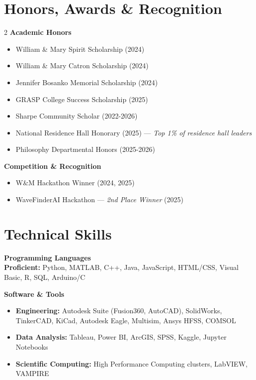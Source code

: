 \documentclass[11pt,letterpaper]{article}
\begin{document}
\section{Honors, Awards \& Recognition}

\begin{multicols}{2}
\noindent\textbf{Academic Honors}
\begin{itemize}
    \item William \& Mary Spirit Scholarship (2024)
    \item William \& Mary Catron Scholarship (2024)
    \item Jennifer Bosanko Memorial Scholarship (2024)
    \item GRASP College Success Scholarship (2025)
    \item Sharpe Community Scholar (2022-2026)
    \item National Residence Hall Honorary (2025) — \textit{Top 1\% of residence hall leaders}
    \item Philosophy Departmental Honors (2025-2026)
\end{itemize}

\columnbreak

\noindent\textbf{Competition \& Recognition}
\begin{itemize}
    \item W\&M Hackathon Winner (2024, 2025)
    \item WaveFinderAI Hackathon — \textit{2nd Place Winner} (2025)
\end{itemize}
\end{multicols}

\section{Technical Skills}

\noindent
\textbf{Programming Languages}\\
\textbf{Proficient:} Python, MATLAB, C++, Java, JavaScript, HTML/CSS, Visual Basic, R, SQL, Arduino/C

\vspace{6pt}
\noindent
\textbf{Software \& Tools}
\begin{itemize}
    \item \textbf{Engineering:} Autodesk Suite (Fusion360, AutoCAD), SolidWorks, TinkerCAD, KiCad, Autodesk Eagle, Multisim, Ansys HFSS, COMSOL
    \item \textbf{Data Analysis:} Tableau, Power BI, ArcGIS, SPSS, Kaggle, Jupyter Notebooks
    \item \textbf{Scientific Computing:} High Performance Computing clusters, LabVIEW, VAMPIRE
\end{itemize}
\end{document}
